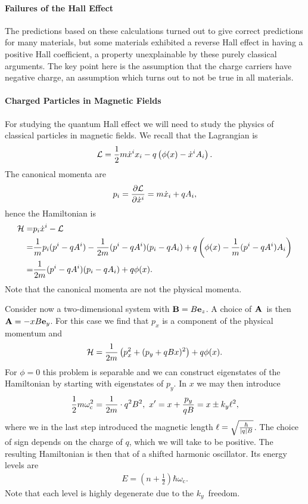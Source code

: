 \paragraph{Failures of the Hall Effect}
The predictions based on these calculations turned out to give correct predictions for many materials, but some materials exhibited a reverse Hall effect in having a positive Hall coefficient, a property unexplainable by these purely classical arguments. The key point here is the assumption that the charge carriers have negative charge, an assumption which turns out to not be true in all materials.

\paragraph{Charged Particles in Magnetic Fields}
For studying the quantum Hall effect we will need to study the physics of classical particles in magnetic fields. We recall that the Lagrangian is
\begin{align*}
	\mathcal{L} = \frac{1}{2}m\dot{x}^{i}x_{i} - q\left(\phi(x) - \dot{x}^{i}A_{i}\right).
\end{align*}
The canonical momenta are
\begin{align*}
	p_{i} = \pdv{\ensuremath{\mathcal{L}}}{\dot{x}^{i}} = m\dot{x}_{i} + qA_{i},
\end{align*}
hence the Hamiltonian is
\begin{align*}
	\mathcal{H} =& p_{i}\dot{x}^{i} - \mathcal{L} \\
	     =& \frac{1}{m}p_{i}(p^{i} - qA^{i}) - \frac{1}{2m}(p^{i} - qA^{i})(p_{i} - qA_{i}) + q\left(\phi(x) - \frac{1}{m}(p^{i} - qA^{i})A_{i}\right) \\
	     =& \frac{1}{2m}(p^{i} - qA^{i})(p_{i} - qA_{i}) + q\phi(x).
\end{align*}
Note that the canonical momenta are not the physical momenta.

Consider now a two-dimensional system with $\vb{B} = B\vb{e}_{z}$. A choice of $\vb{A}$ is then $\vb{A} = -xB\vb{e}_{y}$. For this case we find that $p_{x}$ is a component of the physical momentum and
\begin{align*}
	\mathcal{H} = \frac{1}{2m}\left(p_{x}^{2} + (p_{y} + qBx)^{2}\right) + q\phi(x).
\end{align*}
For $\phi = 0$ this problem is separable and we can construct eigenstates of the Hamiltonian by starting with eigenstates of $p_{y}$. In $x$ we may then introduce
\begin{align*}
	\frac{1}{2}m\omega_{\text{c}}^{2} = \frac{1}{2m}\cdot q^{2}B^{2},\ x\p = x + \frac{p_{y}}{qB} = x \pm k_{y}\ell^{2},
\end{align*}
where we in the last step introduced the magnetic length $\ell = \sqrt{\frac{\hbar}{\abs{q}B}}$. The choice of sign depends on the charge of $q$, which we will take to be positive. The resulting Hamiltonian is then that of a shifted harmonic oscillator. Its energy levels are
\begin{align*}
	E = \left(n + \frac{1}{2}\right)\hbar\omega_{\text{c}}.
\end{align*}
Note that each level is highly degenerate due to the $k_{y}$ freedom.

